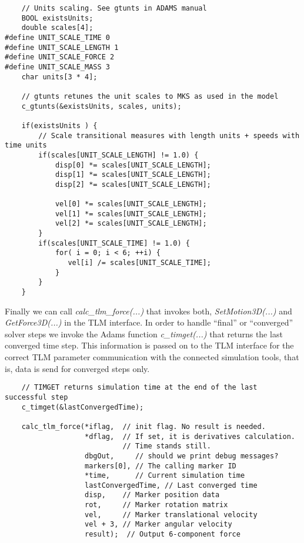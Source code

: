 {
\scriptsize
\begin{verbatim}
    // Units scaling. See gtunts in ADAMS manual
    BOOL existsUnits;
    double scales[4];
#define UNIT_SCALE_TIME 0
#define UNIT_SCALE_LENGTH 1
#define UNIT_SCALE_FORCE 2
#define UNIT_SCALE_MASS 3
    char units[3 * 4];

    // gtunts retunes the unit scales to MKS as used in the model
    c_gtunts(&existsUnits, scales, units);

    if(existsUnits ) {	
        // Scale transitional measures with length units + speeds with time units
        if(scales[UNIT_SCALE_LENGTH] != 1.0) {
            disp[0] *= scales[UNIT_SCALE_LENGTH];
            disp[1] *= scales[UNIT_SCALE_LENGTH];
            disp[2] *= scales[UNIT_SCALE_LENGTH];

            vel[0] *= scales[UNIT_SCALE_LENGTH];
            vel[1] *= scales[UNIT_SCALE_LENGTH];
            vel[2] *= scales[UNIT_SCALE_LENGTH];	
        }
        if(scales[UNIT_SCALE_TIME] != 1.0) {
            for( i = 0; i < 6; ++i) {
               vel[i] /= scales[UNIT_SCALE_TIME];
            }
        }
    }
\end{verbatim}
}

Finally we can call {\em calc\_tlm\_force(...)} that invokes both, {\em SetMotion3D(...)} and {\em GetForce3D(...)} in the TLM interface. 
In order to handle ``final'' or ``converged'' solver steps we invoke the Adams function {\em c\_timget(...)} that returns the last converged time step. 
This information is passed on to the TLM interface for the correct TLM parameter communication with the connected simulation tools, that is, data is send for converged steps only.

{
\scriptsize
\begin{verbatim}
    // TIMGET returns simulation time at the end of the last successful step
    c_timget(&lastConvergedTime);

    calc_tlm_force(*iflag,  // init flag. No result is needed.
                   *dflag,  // If set, it is derivatives calculation.
                            // Time stands still.
                   dbgOut,     // should we print debug messages?
                   markers[0], // The calling marker ID
                   *time,      // Current simulation time
                   lastConvergedTime, // Last converged time
                   disp,    // Marker position data
                   rot,     // Marker rotation matrix
                   vel,     // Marker translational velocity
                   vel + 3, // Marker angular velocity
                   result);  // Output 6-component force
\end{verbatim}
}

